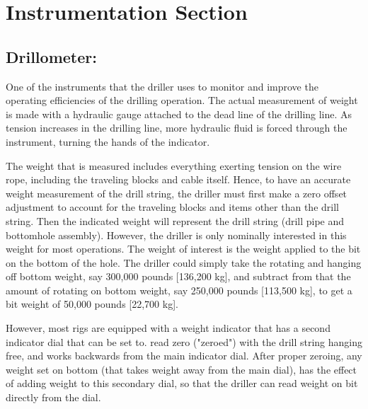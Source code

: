 \chapter{Instrumentation Section}


\section*{Drillometer:} 

One of the instruments that the driller uses to monitor
and improve the operating efficiencies of the drilling operation. The
actual measurement of weight is made with a hydraulic gauge
attached to the dead line of the drilling line. As tension increases in
the drilling line, more hydraulic fluid is forced through the
instrument, turning the hands of the indicator. 

\vspace{1em}

The weight that is measured includes everything exerting tension on the wire rope,
including the traveling blocks and cable itself. Hence, to have an
accurate weight measurement of the drill string, the driller must first
make a zero offset adjustment to account for the traveling blocks and
items other than the drill string. Then the indicated weight will
represent the drill string (drill pipe and bottomhole assembly).
However, the driller is only nominally interested in this weight for
most operations. The weight of interest is the weight applied to the
bit on the bottom of the hole. The driller could simply take the
rotating and hanging off bottom weight, say 300,000 pounds
[136,200 kg], and subtract from that the amount of rotating on bottom
weight, say 250,000 pounds [113,500 kg], to get a bit weight of
50,000 pounds [22,700 kg].

\vspace*{1em}

 However, most rigs are equipped with a
weight indicator that has a second indicator dial that can be set to.
read zero ("zeroed") with the drill string hanging free, and works
backwards from the main indicator dial. After proper zeroing, any
weight set on bottom (that takes weight away from the main dial), has
the effect of adding weight to this secondary dial, so that the driller
can read weight on bit directly from the dial.

\vspace{1em}

